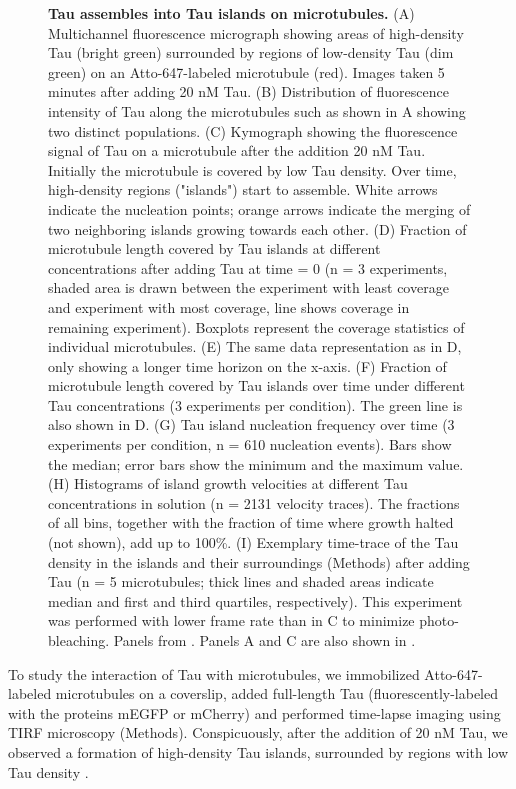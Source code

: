 \begin{figure}[t!]
\caption[Tau assembles into Tau islands on microtubules.]{\textbf{Tau assembles into Tau islands on microtubules.} (A) Multichannel fluorescence micrograph showing areas of high-density Tau (bright green) surrounded by regions of low-density Tau (dim green) on an Atto-647-labeled microtubule (red). Images taken 5 minutes after adding 20 nM Tau. (B) Distribution of fluorescence intensity of Tau along the microtubules such as shown in A showing two distinct populations. (C) Kymograph showing the fluorescence signal of Tau on a microtubule after the addition 20 nM Tau. Initially the microtubule is covered by low Tau density. Over time, high-density regions ("islands") start to assemble. White arrows indicate the nucleation points; orange arrows indicate the merging of two neighboring islands growing towards each other. (D) Fraction of microtubule length covered by Tau islands at different concentrations after adding Tau at time = 0 (n = 3 experiments, shaded area is drawn between the experiment with least coverage and experiment with most coverage, line shows coverage in remaining experiment). Boxplots represent the coverage statistics of individual microtubules. (E) The same data representation as in D, only showing a longer time horizon on the x-axis. (F) Fraction of microtubule length covered by Tau islands over time under different Tau concentrations (3 experiments per condition). The green line is also shown in D. (G) Tau island nucleation frequency over time (3 experiments per condition, n = 610 nucleation events). Bars show the median; error bars show the minimum and the maximum value. (H) Histograms of island growth velocities at different Tau concentrations in solution (n = 2131 velocity traces). The fractions of all bins, together with the fraction of time where growth halted (not shown), add up to 100\%. (I) Exemplary time-trace of the Tau density in the islands and their surroundings (Methods) after adding Tau (n = 5 microtubules; thick lines and shaded areas indicate median and first and third quartiles, respectively). This experiment was performed with lower frame rate than in C to minimize photo-bleaching. Panels from \cite{Siahaan2019a}. Panels A and C are also shown in \cite{Siahaan}.
	}\label{TauGROW}
\end{figure}

To study the interaction of Tau with microtubules, we immobilized Atto-647-labeled microtubules on a coverslip, added full-length Tau (fluorescently-labeled with the proteins mEGFP or mCherry) and performed time-lapse imaging using TIRF microscopy (Methods). Conspicuously, after the addition of 20 nM Tau, we observed a formation of high-density Tau islands, surrounded by regions with low Tau density . 

